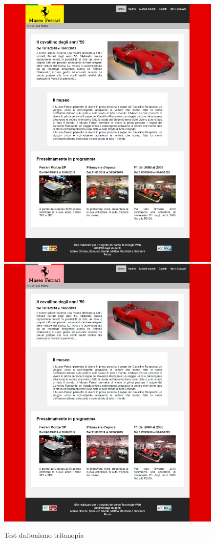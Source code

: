 \begin{figure}[!h]
	\begin{center}
		\includegraphics[scale=0.144]{Images/original.png}
		\includegraphics[scale=0.6]{Images/tritanopia.png}
		\caption{Test daltonismo tritanopia}
	\end{center}
\end{figure}
